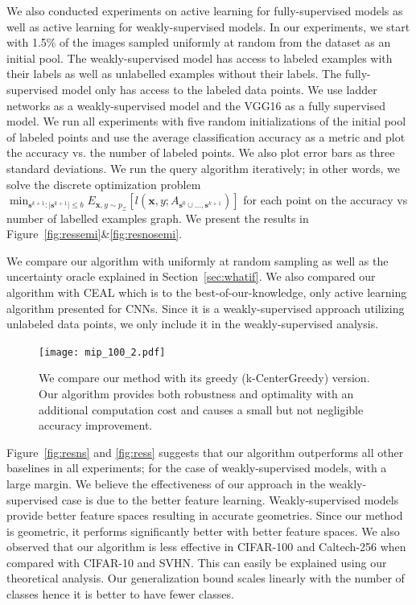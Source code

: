 \documentclass{article}
\begin{document}
We also conducted experiments on active learning for fully-supervised models as well as active learning for weakly-supervised models. In our experiments, we start with 1.5\% of the images sampled uniformly at random from the dataset as an initial pool. The weakly-supervised model has access to labeled examples with their labels as well as unlabelled examples without their labels. The fully-supervised model only has access to the labeled data points. We use ladder networks\cite{ladder} as a weakly-supervised model and the VGG16\cite{vgg} as a fully supervised model. We run all experiments with five random initializations of the initial pool of labeled points and use the average classification accuracy as a metric and plot the accuracy vs. the number of labeled points. We also plot error bars as three standard deviations. We run the query algorithm iteratively; in other words, we solve the discrete optimization problem $\min_{\mathbf{s}^{k+1} : |\mathbf{s}^{k+1}| \leq b} E_{\mathbf{x},y \sim p_\mathcal{Z}} [l(\mathbf{x},y; A_{\mathbf{s}^{0} \cup \ldots, \mathbf{s}^{k+1}})]$ for each point on the accuracy vs number of labelled examples graph. We present the results in Figure~\ref{fig:ressemi}\&\ref{fig:resnosemi}.


We compare our algorithm with uniformly at random sampling as well as the uncertainty oracle explained in Section~\ref{sec:whatif}. We also compared our algorithm with CEAL \cite{wang2016cost} which is to the best-of-our-knowledge, only active learning algorithm presented for CNNs. Since it is a weakly-supervised approach utilizing unlabeled data points, we only include it in the weakly-supervised analysis.

 \begin{figure}
\texttt{[image: mip\_100\_2.pdf]}
\caption{We compare our method with its greedy (k-CenterGreedy) version. Our algorithm provides both robustness and optimality with an additional computation cost and causes a small but not negligible accuracy improvement. }
\label{fig:twoopt}
\end{figure}

Figure~\ref{fig:resns} and \ref{fig:ress} suggests that our algorithm outperforms all other baselines in all experiments; for the case of weakly-supervised models, with a large margin. We believe the effectiveness of our approach in the weakly-supervised case is due to the better feature learning. Weakly-supervised models provide better feature spaces resulting in accurate geometries. Since our method is geometric, it performs significantly better with better feature spaces. We also observed that our algorithm is less effective in CIFAR-100 and Caltech-256 when compared with CIFAR-10 and SVHN. This can easily be explained using our theoretical analysis. Our generalization bound scales linearly with the number of classes hence it is better to have fewer classes.
\end{document}
